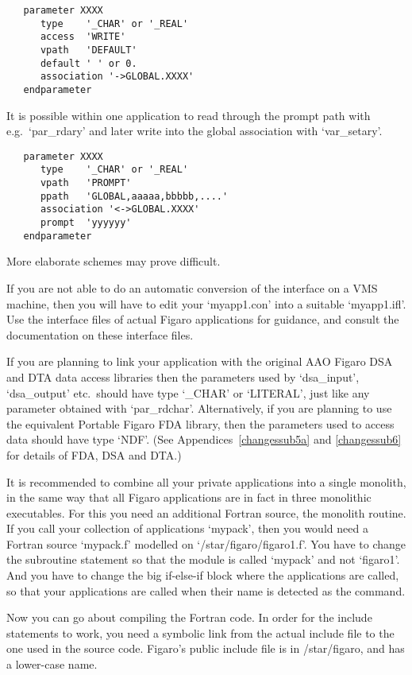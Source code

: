 \begin{verbatim}
   parameter XXXX
      type    '_CHAR' or '_REAL'
      access  'WRITE'
      vpath   'DEFAULT'
      default ' ' or 0.
      association '->GLOBAL.XXXX'
   endparameter
\end{verbatim}

   It is possible within one application to read through the prompt path
   with e.g.\ `par\_rdary' and later write into the global association
   with `var\_setary'.

\begin{verbatim}
   parameter XXXX
      type    '_CHAR' or '_REAL'
      vpath   'PROMPT'
      ppath   'GLOBAL,aaaaa,bbbbb,....'
      association '<->GLOBAL.XXXX'
      prompt  'yyyyyy'
   endparameter
\end{verbatim}

   More elaborate schemes may prove difficult.

   If you are not able to do an automatic conversion of the interface on
   a VMS machine, then you will have to edit your `myapp1.con' into a
   suitable `myapp1.ifl'. Use the interface files of actual Figaro
   applications for guidance, and consult the documentation on these
   interface files.

   If you are planning to link your application with the original AAO
   Figaro DSA and DTA data access libraries then the parameters used by
   `dsa\_input', `dsa\_output' etc.\ should have type `\_CHAR' or `LITERAL',
   just like any parameter obtained with `par\_rdchar'.  Alternatively, if
   you are planning to use the equivalent Portable Figaro FDA library, then
   the parameters used to access data should have type `NDF'.  (See
   Appendices~\ref{changessub5a} and \ref{changessub6} for details of FDA,
   DSA and DTA.)

   It is recommended to combine all your private applications into a
   single monolith, in the same way that all Figaro applications are in
   fact in three monolithic executables. For this you need an additional
   Fortran source, the monolith routine. If you call your collection of
   applications `mypack', then you would need a Fortran source
   `mypack.f' modelled on `/star/figaro/figaro1.f'. You have to
   change the subroutine statement so that the module is called `mypack'
   and not `figaro1'. And you have to change the big if-else-if block
   where the applications are called, so that your applications are
   called when their name is detected as the command.

   Now you can go about compiling the Fortran code. In order for the
   include statements to work, you need a symbolic link from the actual
   include file to the one used in the source code. Figaro's public
   include file is in /star/figaro, and has a lower-case name.


